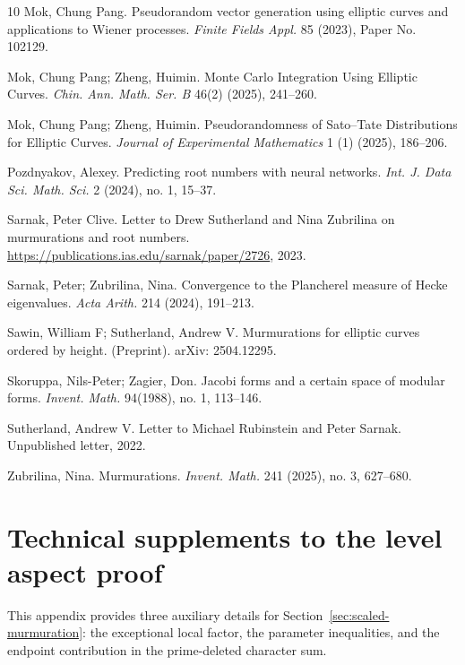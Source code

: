 \documentclass[12pt,reqno]{amsart}
\numberwithin{equation}{section}
\theoremstyle{plain}
\theoremstyle{definition}
\theoremstyle{remark}
\begin{document}
\begin{thebibliography}{10}
Mok, Chung Pang.
Pseudorandom vector generation using elliptic curves and applications to Wiener processes.
\emph{Finite Fields Appl.} 85 (2023), Paper No. 102129.


Mok, Chung Pang; Zheng, Huimin.
Monte Carlo Integration Using Elliptic Curves.
\emph{Chin. Ann. Math. Ser. B} 46(2) (2025), 241--260.


Mok, Chung Pang; Zheng, Huimin. Pseudorandomness of Sato--Tate Distributions for Elliptic Curves.
\emph{Journal of Experimental Mathematics} 1 (1) (2025), 186--206.


Pozdnyakov, Alexey.
Predicting root numbers with neural networks.
\emph{Int. J. Data Sci. Math. Sci.} 2 (2024), no. 1, 15--37.


Sarnak, Peter Clive.
Letter to Drew Sutherland and Nina Zubrilina on murmurations and root numbers.
\url{https://publications.ias.edu/sarnak/paper/2726}, 2023.


Sarnak, Peter; Zubrilina, Nina.
Convergence to the Plancherel measure of Hecke eigenvalues.
\emph{Acta Arith.} 214 (2024), 191--213.


Sawin, William F; Sutherland, Andrew V.
Murmurations for elliptic curves ordered by height.
(Preprint).
arXiv: 2504.12295.


Skoruppa, Nils-Peter; Zagier, Don.
Jacobi forms and a certain space of modular forms.
\emph{Invent. Math.} 94(1988), no. 1, 113--146.


Sutherland, Andrew V.
Letter to Michael Rubinstein and Peter Sarnak.
Unpublished letter, 2022.


Zubrilina, Nina.
Murmurations.
\emph{Invent. Math.} 241 (2025), no. 3, 627--680.

\enlargethispage{5\baselineskip}
\end{thebibliography}

\newpage

\appendix

\section{Technical supplements to the level aspect proof}
\label{appProof}

This appendix provides three auxiliary details for Section~\ref{sec:scaled-murmuration}: the exceptional local factor, the parameter inequalities, and the endpoint contribution in the prime-deleted character sum.
\end{document}
